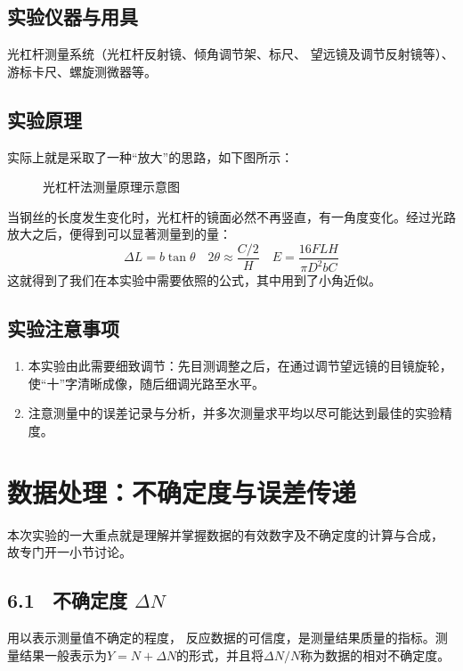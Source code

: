 \documentclass[UTF8]{article}
\theoremstyle{MyLineTheoremStyle} %
\theoremstyle{MyBlockTheoremStyle} %
\theoremstyle{MySubsubsectionStyle} %
\begin{document}
\subsection{实验仪器与用具}
光杠杆测量系统（光杠杆反射镜、倾角调节架、标尺、
望远镜及调节反射镜等）、游标卡尺、螺旋测微器等。

\subsection{实验原理}

实际上就是采取了一种“放大”的思路，如下图所示：
\begin{figure}[H]
    \centering
    \caption{光杠杆法测量原理示意图}
\end{figure}
当钢丝的长度发生变化时，光杠杆的镜面必然不再竖直，有一角度变化。经过光路放大之后，便得到可以显著测量到的量：
\begin{equation}
    \Delta L=b\tan \theta\quad 2\theta \approx \frac{C/2}{H}
    \quad E=\frac{16FLH}{\pi D^2bC}
\end{equation}
这就得到了我们在本实验中需要依照的公式，其中用到了小角近似。


\subsection{实验注意事项}
\begin{enumerate}
\item 本实验由此需要细致调节：先目测调整之后，在通过调节望远镜的目镜旋轮，使“十”字清晰成像，随后细调光路至水平。
\item 注意测量中的误差记录与分析，并多次测量求平均以尽可能达到最佳的实验精度。

\end{enumerate}


\section{数据处理：不确定度与误差传递}

本次实验的一大重点就是理解并掌握数据的有效数字及不确定度的计算与合成，
故专门开一小节讨论。

\subsection*{6.1 \ 不确定度 $\Delta N$}

用以表示测量值不确定的程度，
反应数据的可信度，是测量结果质量的指标。测量结果一般表示为$Y=N+\Delta N$的形式，并且将$\Delta N/N$称为数据的相对不确定度。
\end{document}
